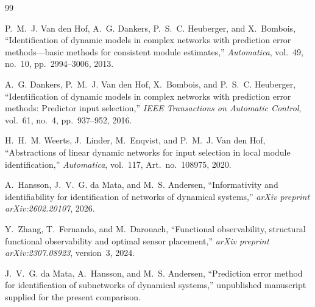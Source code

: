 \documentclass[11pt,a4paper]{article}
\begin{document}
\begin{thebibliography}{99}

P.~M.~J. Van den Hof, A.~G. Dankers, P.~S.~C. Heuberger, and X.~Bombois,
``Identification of dynamic models in complex networks with prediction error methods---basic methods for consistent module estimates,''
\emph{Automatica}, vol.~49, no.~10, pp.~2994--3006, 2013.

A.~G. Dankers, P.~M.~J. Van den Hof, X.~Bombois, and P.~S.~C. Heuberger,
``Identification of dynamic models in complex networks with prediction error methods: Predictor input selection,''
\emph{IEEE Transactions on Automatic Control}, vol.~61, no.~4, pp.~937--952, 2016.

H.~H.~M. Weerts, J.~Linder, M.~Enqvist, and P.~M.~J. Van den Hof,
``Abstractions of linear dynamic networks for input selection in local module identification,''
\emph{Automatica}, vol.~117, Art.~no.~108975, 2020.

A.~Hansson, J.~V.~G. da Mata, and M.~S. Andersen,
``Informativity and identifiability for identification of networks of dynamical systems,''
\emph{arXiv preprint arXiv:2602.20107}, 2026.

Y.~Zhang, T.~Fernando, and M.~Darouach,
``Functional observability, structural functional observability and optimal sensor placement,''
\emph{arXiv preprint arXiv:2307.08923}, version~3, 2024.

J.~V.~G. da Mata, A.~Hansson, and M.~S. Andersen,
``Prediction error method for identification of subnetworks of dynamical systems,''
unpublished manuscript supplied for the present comparison.

\end{thebibliography}
\end{document}
